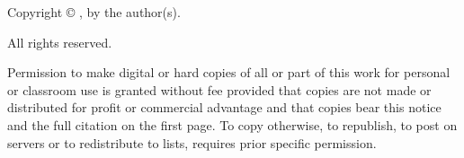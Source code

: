 \clearpage
\thispagestyle{empty}
\vspace*{3in}

\begin{center}
Copyright \copyright{} \the\year, by the author(s).

All rights reserved.
\end{center}

\noindent
Permission to make digital or hard copies of all or part of this work for personal or classroom use is granted without fee provided that copies are not made or distributed for profit or commercial advantage and that copies bear this notice and the full citation on the first page. To copy otherwise, to republish, to post on servers or to redistribute to lists, requires prior specific permission.
